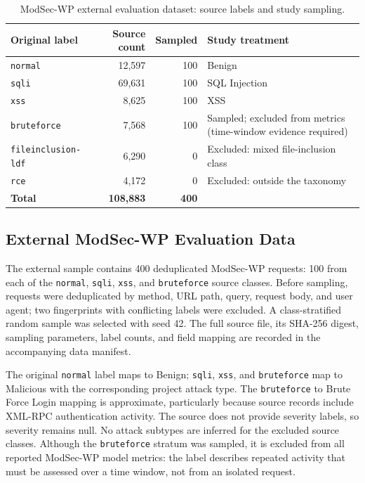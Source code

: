 \begin{table}[H]
\centering
\caption{ModSec-WP external evaluation dataset: source labels and study sampling.}
\label{tab:modsec-source-sample}
{\small
\setlength{\tabcolsep}{4pt}
\begin{tabular}{@{}lrrp{6cm}@{}}
\toprule
\textbf{Original label} & \textbf{Source count} & \textbf{Sampled} & \textbf{Study treatment} \\
\midrule
\texttt{normal} & 12{,}597 & 100 & Benign \\
\texttt{sqli} & 69{,}631 & 100 & SQL Injection \\
\texttt{xss} & 8{,}625 & 100 & XSS \\
\texttt{bruteforce} & 7{,}568 & 100 & Sampled; excluded from metrics (time-window evidence required) \\
\texttt{fileinclusion-ldf} & 6{,}290 & 0 & Excluded: mixed file-inclusion class \\
\texttt{rce} & 4{,}172 & 0 & Excluded: outside the taxonomy \\
\midrule
\textbf{Total} & \textbf{108{,}883} & \textbf{400} & \\
\bottomrule
\end{tabular}
}
\end{table}

\subsection{External ModSec-WP Evaluation Data}
\label{dataset-modsec-evaluation}

The external sample contains 400 deduplicated ModSec-WP requests: 100
from each of the \texttt{normal}, \texttt{sqli}, \texttt{xss}, and
\texttt{bruteforce} source classes. Before sampling, requests were
deduplicated by method, URL path, query, request body, and user agent;
two fingerprints with conflicting labels were excluded. A
class-stratified random sample was selected with seed 42. The full source file,
its SHA-256 digest, sampling parameters, label counts, and field mapping
are recorded in the accompanying data manifest.

The original \texttt{normal} label maps to Benign; \texttt{sqli},
\texttt{xss}, and \texttt{bruteforce} map to Malicious with the
corresponding project attack type. The \texttt{bruteforce} to Brute
Force Login mapping is approximate, particularly because source records
include XML-RPC authentication activity. The source does not provide
severity labels, so severity remains null. No attack subtypes are
inferred for the excluded source classes. Although the
\texttt{bruteforce} stratum was sampled, it is excluded from all reported
ModSec-WP model metrics: the label describes repeated activity that
must be assessed over a time window, not from an isolated request.

